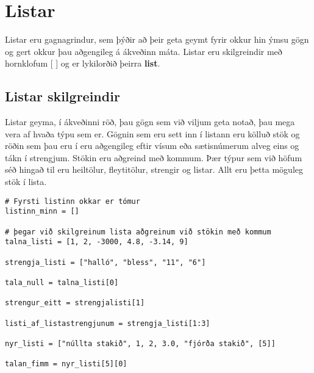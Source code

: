 
\chapter{Listar}\label{k:listar}
Listar eru gagnagrindur, sem þýðir að þeir geta geymt fyrir okkur hin ýmsu gögn og gert okkur þau aðgengileg á ákveðinn máta.
Listar eru skilgreindir með hornklofum [ ] og er lykilorðið þeirra \textbf{list}.

\section{Listar skilgreindir}\label{uk:listar-skilgreindir}
Listar geyma, í ákveðinni röð, þau gögn sem við viljum geta notað, þau mega vera af hvaða týpu sem er.
Gögnin sem eru sett inn í listann eru kölluð stök og röðin sem þau eru í eru aðgengileg eftir vísum eða sætisnúmerum alveg eins og tákn í strengjum.
Stökin eru aðgreind með kommum.
Þær týpur sem við höfum séð hingað til eru heiltölur, fleytitölur, strengir og listar.
Allt eru þetta möguleg stök í lista.

\begin{lstlisting}[caption=Listar skilgreindir, label=lst:listar-skilgreindir]
# Fyrsti listinn okkar er tómur
listinn_minn = []

# þegar við skilgreinum lista aðgreinum við stökin með kommum
talna_listi = [1, 2, -3000, 4.8, -3.14, 9]

strengja_listi = ["halló", "bless", "11", "6"]

tala_null = talna_listi[0]

strengur_eitt = strengjalisti[1]

listi_af_listastrengjunum = strengja_listi[1:3]

nyr_listi = ["núllta stakið", 1, 2, 3.0, "fjórða stakið", [5]]

talan_fimm = nyr_listi[5][0]
\end{lstlisting}

